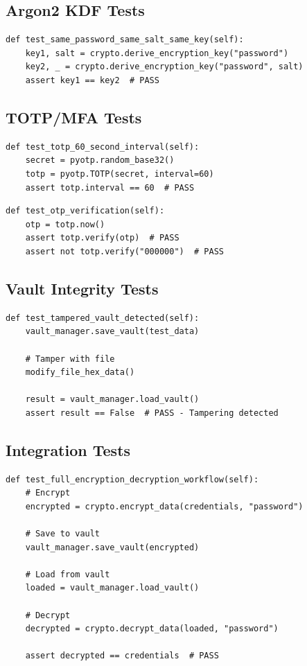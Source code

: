 \documentclass[12pt,a4paper]{report}
\begin{document}
\subsection{Argon2 KDF Tests}

\begin{lstlisting}[caption=Test Case: Key Derivation Consistency]
def test_same_password_same_salt_same_key(self):
    key1, salt = crypto.derive_encryption_key("password")
    key2, _ = crypto.derive_encryption_key("password", salt)
    assert key1 == key2  # PASS
\end{lstlisting}

\subsection{TOTP/MFA Tests}

\begin{lstlisting}[caption=Test Case: 60-Second Interval]
def test_totp_60_second_interval(self):
    secret = pyotp.random_base32()
    totp = pyotp.TOTP(secret, interval=60)
    assert totp.interval == 60  # PASS
\end{lstlisting}

\begin{lstlisting}[caption=Test Case: OTP Verification]
def test_otp_verification(self):
    otp = totp.now()
    assert totp.verify(otp)  # PASS
    assert not totp.verify("000000")  # PASS
\end{lstlisting}

\subsection{Vault Integrity Tests}

\begin{lstlisting}[caption=Test Case: Tampering Detection]
def test_tampered_vault_detected(self):
    vault_manager.save_vault(test_data)
    
    # Tamper with file
    modify_file_hex_data()
    
    result = vault_manager.load_vault()
    assert result == False  # PASS - Tampering detected
\end{lstlisting}

\subsection{Integration Tests}

\begin{lstlisting}[caption=Test Case: Full Encryption Workflow]
def test_full_encryption_decryption_workflow(self):
    # Encrypt
    encrypted = crypto.encrypt_data(credentials, "password")
    
    # Save to vault
    vault_manager.save_vault(encrypted)
    
    # Load from vault
    loaded = vault_manager.load_vault()
    
    # Decrypt
    decrypted = crypto.decrypt_data(loaded, "password")
    
    assert decrypted == credentials  # PASS
\end{lstlisting}
\end{document}
